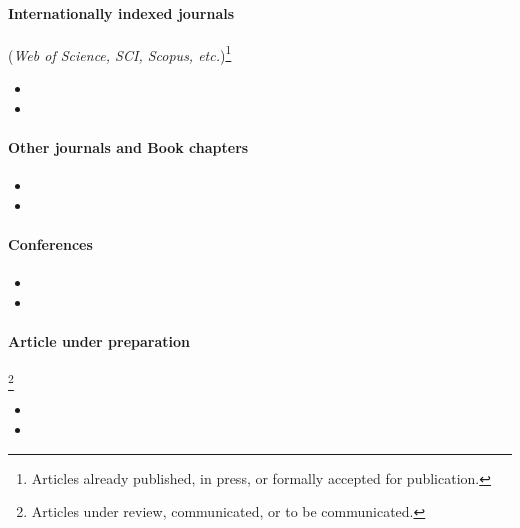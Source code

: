 

\paragraph{Internationally indexed journals} (\textit{Web of Science, SCI, Scopus, etc.})\footnote{\label{published}Articles already published, in press, or formally accepted for publication.}
\begin{itemize}
\item[1.]
\item[2.]
\end{itemize}  

\paragraph{Other journals and Book chapters}\footnotemark[\ref{published}]
\begin{itemize}
\item[1.]
\item[2.]
\end{itemize}  

\paragraph{Conferences}\footnotemark[\ref{published}]
\begin{itemize}
\item[1.]
\item[2.]
\end{itemize}  

\paragraph{Article under preparation}\footnote{\label{unpublished}Articles under review, communicated, or to be communicated.}
\begin{itemize}
\item[1.]
\item[2.]
\end{itemize}  
%
%  
%
%
